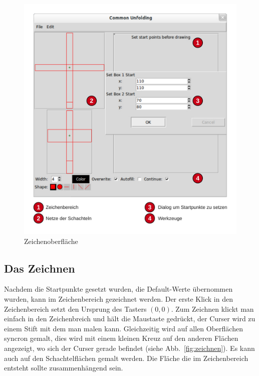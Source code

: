 \begin{figure}[htbp]
  \centering
  \includegraphics[scale=0.5]{03_pics/Zeichenbereich.pdf}
  \caption{Zeichenoberfläche}
  \label{fig:zeichenoberflaeche}
\end{figure}

\subsection{Das Zeichnen}
\label{subsec:zeichnen}
Nachdem die Startpunkte gesetzt wurden, \bzw die Default-Werte übernommen wurden, kann im Zeichenbereich gezeichnet werden. Der erste Klick in den Zeichenbereich setzt den Ursprung des Tasters $(0,0)$. Zum Zeichnen klickt man einfach in den Zeichenbreich und hält die Maustaste gedrückt, der Curser wird zu einem Stift mit dem man malen kann. Gleichzeitig wird auf allen Oberflächen syncron gemalt, dies wird mit einem kleinen Kreuz auf den anderen Flächen angezeigt, wo sich der Curser gerade befindet (siehe Abb.~\ref{fig:zeichnen}). Es kann auch auf den Schachtelflächen gemalt werden. Die Fläche die im Zeichenbereich entsteht sollte zusammenhängend sein.

